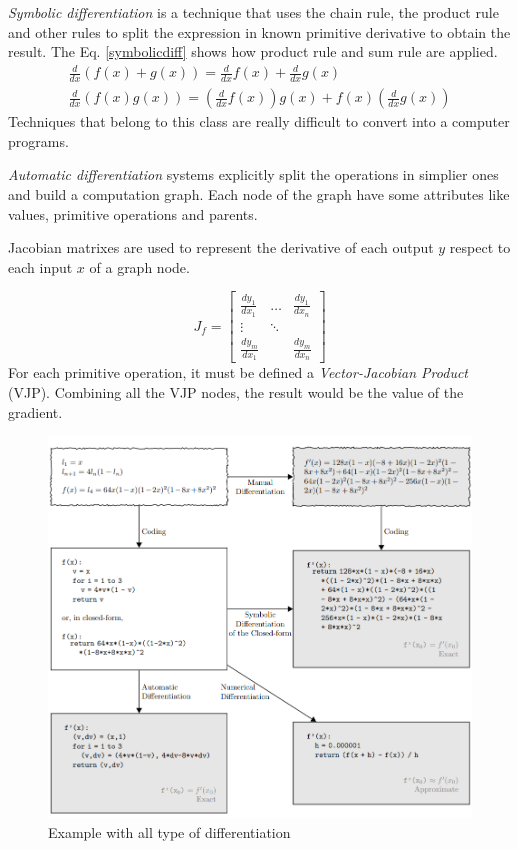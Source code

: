 \documentclass[12pt]{report}
\begin{document}
\textit{Symbolic differentiation} is a technique that uses the chain rule, the product rule and other rules to 
split the expression in known primitive derivative to obtain the result.
The Eq. \ref{symbolicdiff} shows how product rule and sum rule are applied.
%
\begin{equation}
    \begin{array}{l}
    \frac{d}{dx} (f(x) + g(x)) = \frac{d}{dx} f(x) + \frac{d}{dx}g(x) \\
    \frac{d}{dx} (f(x)g(x)) = \left(\frac{d}{dx} f(x)\right) g(x) + f(x)\left(\frac{d}{dx}g(x)\right)
    \end{array}
    \label{symbolicdiff}
\end{equation}
Techniques that belong to this class are really difficult to convert into a computer programs.

\textit{Automatic differentiation} systems explicitly split the operations in simplier ones and build a computation graph.
Each node of the graph have some attributes like values, primitive operations and parents.

Jacobian matrixes are used to represent the derivative of each output $y$ respect to each input $x$ of a graph node.

\begin{equation}
    J_f = \begin{bmatrix} 
        \frac{dy_1}{dx_1} & \dots & \frac{dy_1}{dx_n} \\
        \vdots & \ddots & \\
        \frac{dy_m}{dx_1} &        & \frac{dy_m}{dx_n}
        \end{bmatrix}
\end{equation}
%
For each primitive operation, it must be defined a \textit{Vector-Jacobian Product} (VJP). 
Combining all the VJP nodes, the result would be the value of the gradient.

\begin{figure}[t]
    \centering
    \includegraphics[scale=.4]{differentiations.png}
    \caption{Example with all type of differentiation \cite{autodiff}}
    \label{fig:differentiations}
\end{figure}
\end{document}
